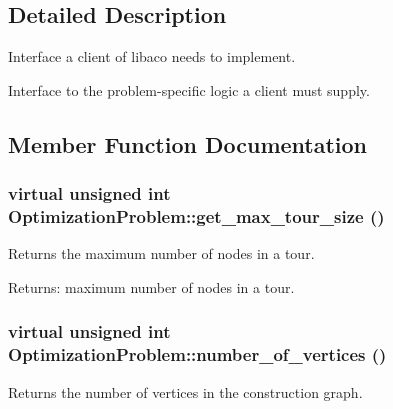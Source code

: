 \subsection{Detailed Description}
Interface a client of libaco needs to implement. 

Interface to the problem-specific logic a client must supply. 

\subsection{Member Function Documentation}
\hypertarget{classOptimizationProblem_c415a4d1350cd3580f2fcf26f7f6196c}{
\subsubsection[get\_\-max\_\-tour\_\-size]{\setlength{\rightskip}{0pt plus 5cm}virtual unsigned int OptimizationProblem::get\_\-max\_\-tour\_\-size ()}}
\label{classOptimizationProblem_c415a4d1350cd3580f2fcf26f7f6196c}


Returns the maximum number of nodes in a tour. 

\begin{Desc}
\item[Returns:]maximum number of nodes in a tour. \end{Desc}
\hypertarget{classOptimizationProblem_3f2b6672193e9b543f9a3419b6a516e8}{
\subsubsection[number\_\-of\_\-vertices]{\setlength{\rightskip}{0pt plus 5cm}virtual unsigned int OptimizationProblem::number\_\-of\_\-vertices ()}}
\label{classOptimizationProblem_3f2b6672193e9b543f9a3419b6a516e8}


Returns the number of vertices in the construction graph. 


